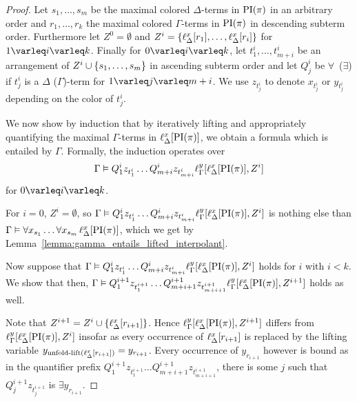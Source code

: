 \begin{proof}
	\newcommand{\thmProofPositions}{\ensuremath{\mathcal{P}}}


	Let $s_1, \dots, s_m$ be the maximal colored $\Delta$-terms in $\operatorname{PI}(\pi)$ in an arbitrary order and
	$r_1, \dots, r_k$ the maximal colored $\Gamma$-terms in $\operatorname{PI}(\pi)$ in descending subterm order.
	Furthermore let $Z^0 = \emptyset$ and $Z^i = \{ \ell_{\Delta}^{x}[r_1], \dots, \ell_{\Delta}^{x}[r_i] \}$ for $1\varleq i \varleq k$.
	Finally for $0\varleq i \varleq k$, 
	let $t_1^i, \dots, t_{m+i}^i$ be an arrangement of $Z^i \cup \{ s_1, \dots, s_m \}$ in ascending subterm order and
	let $Q_j^i$ be $\forall$~($\exists$) if $t_j^i$ is a $\Delta$ ($\Gamma$)-term for $1\varleq j \varleq m+i$.
	We use $z_{t_j^i}$ to denote $x_{t_j^i}$ or $y_{t_j^i}$ depending on the color of $t_j^i$.

	We now show by induction that by iteratively lifting and appropriately quantifying the maximal $\Gamma$-terms in $\ell_{\Delta}^{x}[\operatorname{PI}(\pi)]$, we obtain a formula which is entailed by $\Gamma$.
	Formally, the induction operates over \[\Gamma \vDash Q_1^i z_{t_1^i} \dots Q_{m+i}^i z_{t_{m+i}^i} \ell_{\Gamma}^{y}[ \ell_{\Delta}^{x}[\operatorname{PI}(\pi) ], Z^i ]\] for $0 \varleq i \varleq k$.

	For $i=0$, $Z^i = \emptyset$, so $\Gamma \vDash Q_1^i z_{t_1^i} \dots Q_{m+i}^i z_{t_{m+i}^i} \ell_{\Gamma}^{y}[ \ell_{\Delta}^{x}[\operatorname{PI}(\pi) ], Z^i ]$ is nothing else than $\Gamma \vDash \forall x_{s_1} \ldots \forall x_{s_m}\,\ell_{\Delta}^{x}[\operatorname{PI}(\pi)]$, which we get by Lemma~\ref{lemma:gamma_entails_lifted_interpolant}.

	Now suppose that $\Gamma \vDash Q_1^i z_{t_1^i} \dots Q_{m+i}^i z_{t_{m+i}^i} \ell_{\Gamma}^{y}[ \ell_{\Delta}^{x}[\operatorname{PI}(\pi) ], Z^i ]$ holds for $i$ with $i < k$.
	We show that then, $\Gamma \vDash Q_1^{i+1} z_{t_1^{i+1}} \dots Q_{m+{i+1}}^{i+1} z_{t_{m+{i+1}}^{i+1}} \ell_{\Gamma}^{y}[ \ell_{\Delta}^{x}[\operatorname{PI}(\pi) ], Z^{i+1} ]$ holds as well.
	
	Note that $Z^{i+1} = Z^i \cup \{ \ell_{\Delta}^{x}[r_{i+1}] \}$. 
	Hence $\ell_{\Gamma}^{y}[ \ell_{\Delta}^{x}[\operatorname{PI}(\pi) ], Z^{i+1} ]$ differs from $\ell_{\Gamma}^{y}[ \ell_{\Delta}^{x}[\operatorname{PI}(\pi) ], Z^i ]$ insofar as every occurrence of $\ell_{\Delta}^{x}[r_{i+1}]$ is replaced by the lifting variable $y_{\operatorname{unfold-lift}(\ell_{\Delta}^{x}[r_{i+1}])} = y_{r_{i+1}}$. 
	Every occurrence of $y_{r_{i+1}}$ however is bound as 
	in the quantifier prefix
	$Q_1^{i+1} z_{t_1^{i+1}} \dots Q_{m+{i+1}}^{i+1} z_{t_{m+{i+1}}^{i+1}}$, there is some $j$ such that $Q_j^{i+1} z_{t_j^{i+1}}$ is $\exists y_{r_{i+1}}$.


\end{proof}
